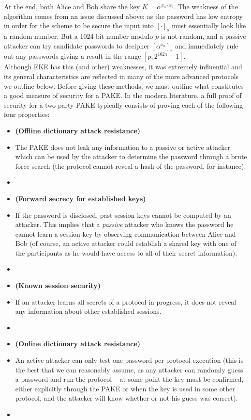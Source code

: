 \documentclass{amsart}
\theoremstyle{remark}
\begin{document}
At the end, both Alice and Bob share the key $K = \alpha^{x_a \cdot x_b}$.  The weakness of the algorithm 
comes from an issue discussed above: as the password has low entropy in order for the scheme to be 
secure the input into $[\cdot]_s$ must essentially look like a random number.  But a 1024 bit number 
modulo $p$ is not random, and a passive attacker can try candidate passwords to decipher 
$\left[\alpha^{x_a}\right]_s$ and immediately rule out any passwords giving a result in the range $[p,2^{1024}-1]$.
\\

Although EKE has this (and other) weaknesses, it was extremely influential and its general characteristics are 
reflected in many of the more advanced protocols we outline below.  Before giving these methods, we must outline 
what constitutes a good measure of security for a PAKE.  In the modern literature, a full proof of security for a 
two party PAKE typically consists of proving each of the following four properties:
\\

\begin{itemize}
 \item[] \textbf{(Offline dictionary attack resistance)}
 \item[] The PAKE does not leak any information to a passive or active attacker which can be 
 used by the attacker to determine the password through a brute force search (the protocol 
 cannot reveal a hash of the password, for instance).
 \item[]
 \item[] \textbf{(Forward secrecy for established keys)}
 \item[] If the password is disclosed, past session keys cannot be computed by an attacker.  
 This implies that a \emph{passive} attacker who knows the password he cannot learn a session 
 key by observing communication between Alice and Bob (of course, an active attacker could 
 establish a shared key with one of the participants as he would have access to all of their 
 secret information).
 \item[]
 \item[] \textbf{(Known session security)}
 \item[] If an attacker learns all secrets of a protocol in progress, it does not reveal 
 any information about other established sessions.
  \item[]
 \item[] \textbf{(Online dictionary attack resistance)}
 \item[] An active attacker can only test one password per protocol execution (this is the 
 best that we can reasonably assume, as any attacker can randomly guess a password and 
 run the protocol -- at some point the key must be confirmed, either explicitly through the 
 PAKE or when the key is used in some other protocol, and the attacker will know whether or
 not his guess was correct).
\item[]
\end{itemize}
\end{document}
